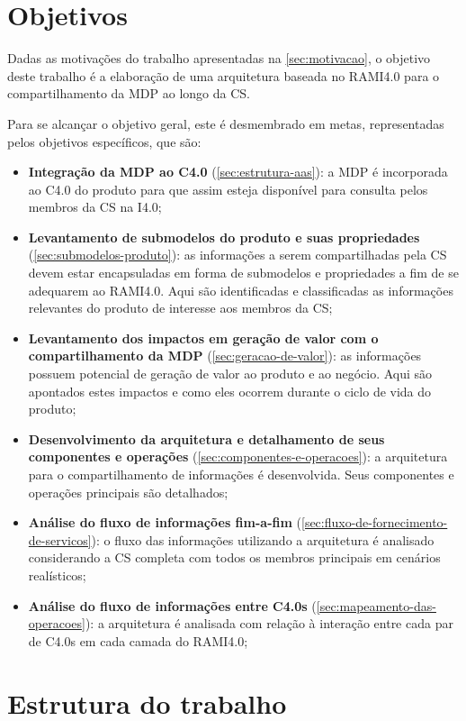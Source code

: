\section{Objetivos}
\label{sec:objetivos}

Dadas as motivações do trabalho apresentadas na \autoref{sec:motivacao}, o objetivo deste trabalho é a elaboração de uma arquitetura baseada no RAMI4.0 para o compartilhamento da MDP ao longo da CS.

Para se alcançar o objetivo geral, este é desmembrado em metas, representadas pelos objetivos específicos, que são:

\begin{itemize}
	\item \textbf{Integração da MDP ao C4.0} (\autoref{sec:estrutura-aas}): a MDP é incorporada ao C4.0 do produto para que assim esteja disponível para consulta pelos membros da CS na I4.0;
	\item \textbf{Levantamento de submodelos do produto e suas propriedades} (\autoref{sec:submodelos-produto}): as informações a serem compartilhadas pela CS devem estar encapsuladas em forma de submodelos e propriedades a fim de se adequarem ao RAMI4.0. Aqui são identificadas e classificadas as informações relevantes do produto de interesse aos membros da CS;
	\item \textbf{Levantamento dos impactos em geração de valor com o compartilhamento da MDP} (\autoref{sec:geracao-de-valor}): as informações possuem potencial de geração de valor ao produto e ao negócio. Aqui são apontados estes impactos e como eles ocorrem durante o ciclo de vida do produto;
	\item \textbf{Desenvolvimento da arquitetura e detalhamento de seus componentes e operações} (\autoref{sec:componentes-e-operacoes}): a arquitetura para o compartilhamento de informações é desenvolvida. Seus componentes e operações principais são detalhados;
	\item \textbf{Análise do fluxo de informações fim-a-fim} (\autoref{sec:fluxo-de-fornecimento-de-servicos}): o fluxo das informações utilizando a arquitetura é analisado considerando a CS completa com todos os membros principais em cenários realísticos;
	\item \textbf{Análise do fluxo de informações entre C4.0s} (\autoref{sec:mapeamento-das-operacoes}): a arquitetura é analisada com relação à interação entre cada par de C4.0s em cada camada do RAMI4.0;
\end{itemize}

\section{Estrutura do trabalho}
\label{sec:estrutura}

